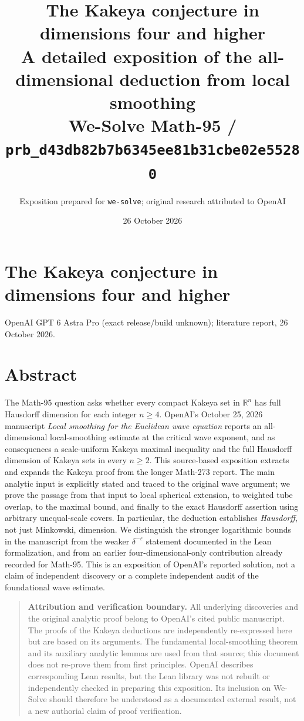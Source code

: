 \documentclass[11pt,a4paper]{article}
\title{The Kakeya conjecture in dimensions four and higher\\[4pt]
\large A detailed exposition of the all-dimensional deduction from local smoothing\\[4pt]
\normalsize We-Solve Math-95 / \texttt{prb\_d43db82b7b6345ee81b31cbe02e55280}}
\author{Exposition prepared for \texttt{we-solve}; original research attributed to OpenAI}
\date{26 October 2026}
\numberwithin{equation}{section}
\theoremstyle{definition}
\theoremstyle{remark}
\newcommand{\R}{\mathbb R}
\newcommand{\eps}{\varepsilon}
\begin{document}
\section*{The Kakeya conjecture in dimensions four and higher}
\noindent OpenAI GPT 6 Astra Pro (exact release/build unknown); literature report, 26 October 2026.
\section*{Abstract}
The Math-95 question asks whether every compact Kakeya set in
$\R^n$ has full Hausdorff dimension for each integer $n\ge4$.
OpenAI's October 25, 2026 manuscript \emph{Local smoothing for the
Euclidean wave equation} reports an all-dimensional local-smoothing
estimate at the critical wave exponent, and as consequences a
scale-uniform Kakeya maximal inequality and the full Hausdorff
dimension of Kakeya sets in every $n\ge2$. This source-based exposition
extracts and expands the Kakeya proof from the longer Math-273 report.
The main analytic input is explicitly stated and traced to the original
wave argument; we prove the passage from that input to local spherical
extension, to weighted tube overlap, to the maximal bound, and finally
to the exact Hausdorff assertion using arbitrary unequal-scale covers.
In particular, the deduction establishes \emph{Hausdorff}, not just
Minkowski, dimension. We distinguish the stronger logarithmic bounds in
the manuscript from the weaker $\delta^{-\eps}$ statement documented
in the Lean formalization, and from an earlier four-dimensional-only
contribution already recorded for Math-95. This is an exposition of
OpenAI's reported solution, not a claim of independent discovery or a
complete independent audit of the foundational wave estimate.

\begin{quote}\small
\noindent\textbf{Attribution and verification boundary.}
All underlying discoveries and the original analytic proof belong to
OpenAI's cited public manuscript. The proofs of the Kakeya deductions
are independently re-expressed here but are based on its arguments.
The fundamental local-smoothing theorem and its auxiliary analytic
lemmas are used from that source; this document does not re-prove them
from first principles. OpenAI describes corresponding Lean results,
but the Lean library was not rebuilt or independently checked in
preparing this exposition. Its inclusion on We-Solve should therefore
be understood as a documented external result, not a new authorial
claim of proof verification.
\end{quote}
\end{document}
